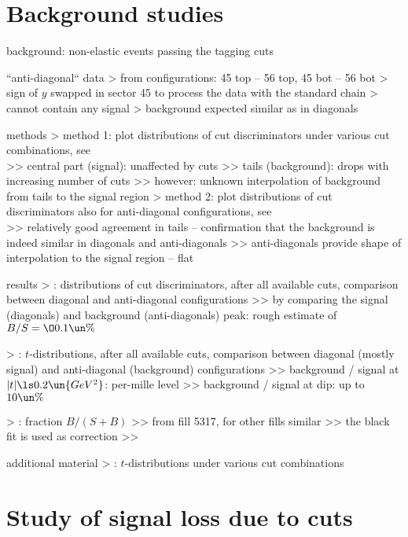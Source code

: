 \section{Background studies}

\> background: non-elastic events passing the tagging cuts

\> ``anti-diagonal`` data
\>> from configurations: 45 top -- 56 top, 45 bot -- 56 bot
\>> sign of $y$ swapped in sector 45 to process the data with the standard chain
\>> cannot contain any signal
\>> background expected similar as in diagonals

\> methods
\>> method 1: plot distributions of cut discriminators under various cut combinations, see\\ 
\>>> central part (signal): unaffected by cuts
\>>> tails (background): drops with increasing number of cuts
\>>> however: unknown interpolation of background from tails to the signal region
\>> method 2: plot distributions of cut discriminators also for anti-diagonal configurations, see\\ 
\>>> relatively good agreement in tails -- confirmation that the background is indeed similar in diagonals and anti-diagonals
\>>> anti-diagonals provide shape of interpolation to the signal region -- flat

\> results
\>> : distributions of cut discriminators, after all available cuts, comparison between diagonal and anti-diagonal configurations
\>>> by comparing the signal (diagonals) and background (anti-diagonals) peak: rough estimate of $B/S = \O{0.1\un{\%}}$

\>> : $t$-distributions, after all available cuts, comparison between diagonal (mostly signal) and anti-diagonal (background) configurations
\>>> background / signal at $|t| \ls 0.2\un{GeV^2}$: per-mille level
\>>> background / signal at dip: up to $10\un{\%}$

\>> : fraction $B / (S+B)$
\>>> from fill 5317, for other fills similar
\>>> the black fit is used as correction
\>>> 


\> additional material
\>> : $t$-distributions under various cut combinations

\section{Study of signal loss due to cuts}


